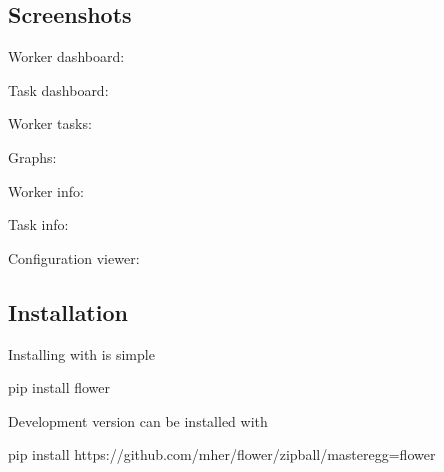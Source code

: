 \documentclass[letterpaper,10pt,english]{sphinxmanual}
\begin{document}
\subsection{Screenshots}
\label{\detokenize{screenshots:screenshots}}\label{\detokenize{screenshots::doc}}
Worker dashboard:

\noindent{}

Task dashboard:

\noindent{}

Worker tasks:

\noindent{}

Graphs:

\noindent{}

Worker info:

\noindent{}

\noindent{}

\noindent{}

\noindent{}

Task info:

\noindent{}

Configuration viewer:

\noindent{}


\subsection{Installation}
\label{\detokenize{install:installation}}\label{\detokenize{install::doc}}
Installing  with  is simple

\begin{sphinxVerbatim}[commandchars=\\\{\}]
\PYGZdl{} pip install flower
\end{sphinxVerbatim}

Development version can be installed with

\begin{sphinxVerbatim}[commandchars=\\\{\}]
\PYGZdl{} pip install https://github.com/mher/flower/zipball/master\PYGZsh{}egg=flower
\end{sphinxVerbatim}
\end{document}
